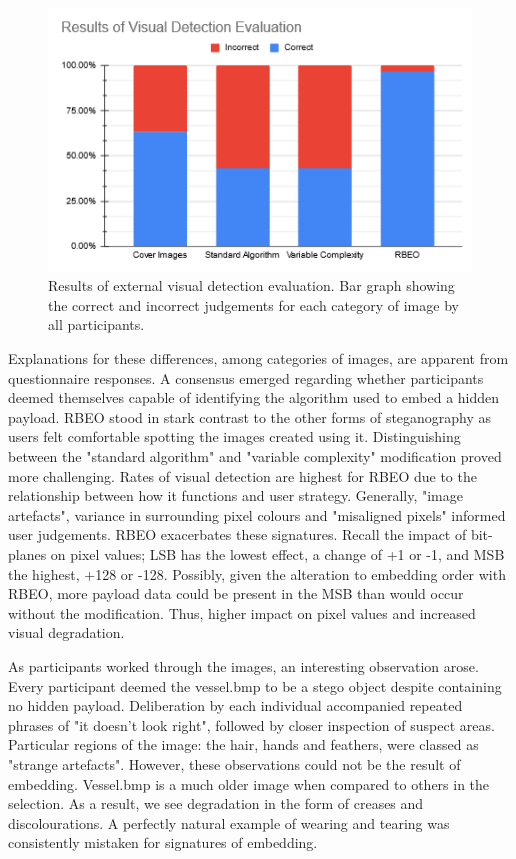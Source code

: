 \documentclass{l4proj}
\begin{document}
\begin{figure}
    \centering
    \includegraphics[width=1.0\textwidth]{images/visual_detection_results.png}
    \caption{Results of external visual detection evaluation. Bar graph showing the correct and incorrect judgements for each category of image by all participants.}
    \label{fig:visual_detection_results}
\end{figure}

Explanations for these differences, among categories of images, are apparent from questionnaire responses.  A consensus emerged regarding whether participants deemed themselves capable of identifying the algorithm used to embed a hidden payload. RBEO stood in stark contrast to the other forms of steganography as users felt comfortable spotting the images created using it. Distinguishing between the "standard algorithm" and "variable complexity" modification proved more challenging. Rates of visual detection are highest for RBEO due to the relationship between how it functions and user strategy. Generally, "image artefacts", variance in surrounding pixel colours and "misaligned pixels" informed user judgements. RBEO exacerbates these signatures. Recall the impact of bit-planes on pixel values; LSB has the lowest effect, a change of +1 or -1, and MSB the highest, +128 or -128. Possibly, given the alteration to embedding order with RBEO, more payload data could be present in the MSB than would occur without the modification. Thus, higher impact on pixel values and increased visual degradation. 

As participants worked through the images, an interesting observation arose. Every participant deemed the vessel.bmp to be a stego object despite containing no hidden payload. Deliberation by each individual accompanied repeated phrases of "it doesn't look right", followed by closer inspection of suspect areas. Particular regions of the image: the hair, hands and feathers, were classed as "strange artefacts". However, these observations could not be the result of embedding. Vessel.bmp is a much older image when compared to others in the selection. As a result, we see degradation in the form of creases and discolourations. A perfectly natural example of wearing and tearing was consistently mistaken for signatures of embedding. 
\end{document}
